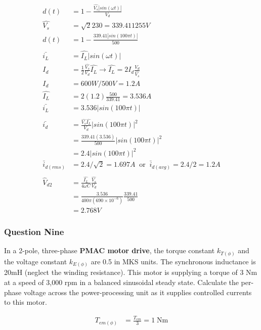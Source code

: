 \documentclass[a4paper,11pt]{article}
\begin{document}
\begin{align*}
    d(t)             & = 1-\frac{\hat{V_s}|sin(\omega t)|}{V_d}                                                       \\
    \hat{V_s}        & = \sqrt{2}230 = 339.411255V                                                                    \\
    d(t)             & = 1-\frac{339.41|sin(100\pi t)|}{500}                                                          \\\\
    \bar{i_L}        & = \hat{I_L}|sin(\omega t)|                                                                     \\
    I_d              & = \frac{1}{2}\frac{\hat{V_s}}{V_d}\hat{I_L} \rightarrow \hat{I_L} = 2I_d \frac{V_d}{\hat{V_s}} \\
    I_d              & = 600W/500V=1.2A                                                                               \\
    \hat{I_L}        & = 2(1.2) \frac{500}{339.41} = 3.536A                                                           \\
    \bar{i_L}        & = 3.536|sin(100\pi t)|                                                                         \\\\
    \bar{i_d}        & = \frac{\hat{V_s}\hat{I_L}}{V_d}|sin(100\pi t)|^2                                              \\
                     & = \frac{339.41(3.536)}{500}|sin(100\pi t)|^2                                                   \\
                     & = 2.4|sin(100\pi t)|^2                                                                         \\
    \bar{i}_{d(rms)} & = 2.4/\sqrt{2} = 1.697A \;\;\mathrm{or}\;\; \bar{i}_{d(avg)} = 2.4/2 = 1.2A                    \\\\
    \hat{V}_{d2}     & = \frac{\hat{I_L}}{4\omega C}\frac{\hat{V_s}}{V_d}                                             \\
                     & = \frac{3.536}{400\pi(690\times10^{-6})}\frac{339.41}{500}                                     \\
                     & = 2.768V
\end{align*}

\newpage
\subsubsection*{Question Nine}
In a 2-pole, three-phase \textbf{PMAC motor drive}, the torque constant $k_{T(\phi)}$ and the voltage constant $k_{E(\phi)}$ are 0.5 in MKS units. The synchronous inductance is 20mH (neglect the winding resistance). This motor is supplying a torque of 3 Nm at a speed of 3,000 rpm in a balanced sinusoidal steady state. Calculate the per-phase voltage across the power-processing unit as it supplies controlled currents to this motor.

\begin{align*}
    T_{em(\phi)} & = \frac{T_{em}}{3} = 1\;\mathrm{Nm} \\
\end{align*}
\end{document}
